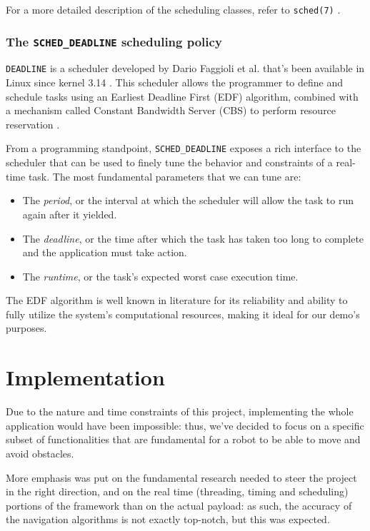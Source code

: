 \documentclass[a4paper,12pt]{report}
\begin{document}
For a more detailed description of the scheduling classes, refer to \texttt{sched(7)} \cite{man-sched-7}.

\subsubsection{The \texttt{SCHED\_DEADLINE} scheduling policy}

\texttt{DEADLINE} is a scheduler developed by Dario Faggioli et al. \cite{lwn-faggioli-mail} that's been available in Linux since kernel 3.14 \cite{kn-linux-314}. This scheduler allows the programmer to define and schedule tasks using an Earliest Deadline First (EDF) algorithm, combined with a mechanism called Constant Bandwidth Server (CBS) to perform resource reservation \cite{cbs-algorithm}.

From a programming standpoint, \texttt{SCHED\_DEADLINE} exposes a rich interface to the scheduler that can be used to finely tune the behavior and constraints of a real-time task. The most fundamental parameters that we can tune are: 

\begin{itemize}
    \item The \textit{period}, or the interval at which the scheduler will allow the task to run again after it yielded.
    \item The \textit{deadline}, or the time after which the task has taken too long to complete and the application must take action.
    \item The \textit{runtime}, or the task's expected worst case execution time.
\end{itemize}

The EDF algorithm is well known in literature for its reliability and ability to fully utilize the system's computational resources, making it ideal for our demo's purposes.

\section{Implementation}

Due to the nature and time constraints of this project, implementing the whole application would have been impossible: thus, we've decided to focus on a specific subset of functionalities that are fundamental for a robot to be able to move and avoid obstacles. 

More emphasis was put on the fundamental research needed to steer the project in the right direction, and on the real time (threading, timing and scheduling) portions of the framework than on the actual payload: as such, the accuracy of the navigation algorithms is not exactly top-notch, but this was expected.
\end{document}
